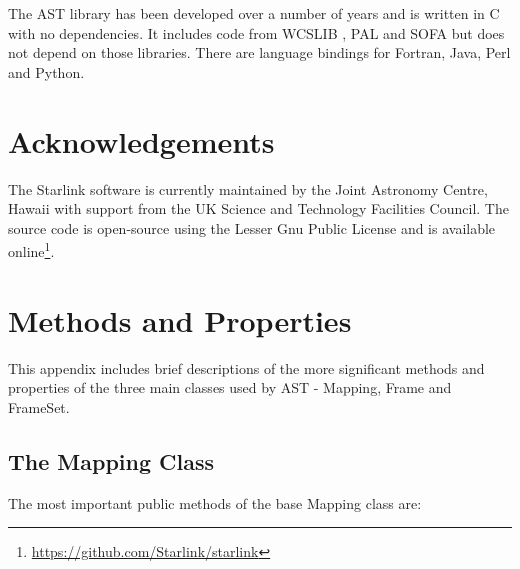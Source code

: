 \documentclass[final,authoryear,5p,times,twocolumn]{elsarticle}
\begin{document}
The AST library has been developed over a number of years
\citep{1998ASPC..145...41W,2000ASPC..216..506W,2001ASPC..238..129B,2004ASPC..314..412B,2008ASPC..394..635B,2010ASPC..434..213B,2012ASPC..461..825B}
  and is written in C with no dependencies. It includes code from
  WCSLIB \citep[][]{2006ASPC..351..591C}, PAL \citep{2013ASPC..475..307J}
  and SOFA \citep[][]{2011SchpJ...611404H} but does not depend on those
  libraries. There are language bindings for Fortran, Java, Perl and
  Python.

\section{Acknowledgements}

The Starlink software is currently maintained by the Joint Astronomy
Centre, Hawaii with support from the UK Science and Technology
Facilities Council. The source code is open-source using the Lesser
Gnu Public License and is available
online\footnote{\url{https://github.com/Starlink/starlink}}.


\appendix

\section{Methods and Properties}
\label{app:classes}

This appendix includes brief descriptions of the more significant methods
and properties of the three main classes used by AST - Mapping, Frame and
FrameSet.

\subsection{The Mapping Class}
The most important public methods of the base Mapping class are:
\end{document}
